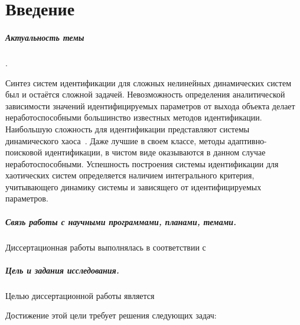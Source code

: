 \chapter*{Введение}

\paragraph{Актуальность темы}.

Синтез систем идентификации для сложных нелинейных динамических систем
был и остаётся сложной задачей. Невозможность определения
аналитической зависимости значений идентифицируемых параметров
от выхода объекта делает неработоспособными большинство известных
методов идентификации. Наибольшую сложность для идентификации
представляют системы динамического хаоса~\cite{moon_chaotic_vibr,anisch_nonlin_eff,sprott_212}.
Даже лучшие в своем классе, методы адаптивно-поисковой идентификации, %
в чистом виде оказываются в данном случае неработоспособными.
Успешность построения системы идентификации для хаотических
систем определяется наличием интегрального критерия,
учитывающего динамику системы и зависящего от идентифицируемых параметров.

\paragraph{Связь работы с научными программами, планами, темами.}
Диссертационная работы выполнялась в соответствии с 

\paragraph{Цель и задания исследования.}
Целью диссертационной работы является

Достижение этой цели требует решения следующих задач:

